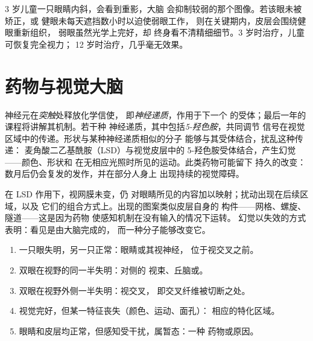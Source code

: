 \begin{example}[为何斜视必须及早治疗]\label{ex:g11:vision-and-brain:amblyopia}
3 岁儿童一只眼睛内斜，会看到重影，大脑
会抑制较弱的那个图像。若该眼未被矫正，或
健眼未每天遮挡数小时以迫使弱眼工作，
则在关键期内，皮层会围绕健眼重新组织，
弱眼虽然光学上完好，却
终身看不清精细细节。3 岁时治疗，儿童可恢复完全视力；
12 岁时治疗，几乎毫无效果。
\end{example}

\section{药物与视觉大脑}

\begin{proposition}\label{prop:g11:vision-and-brain:drugs}
神经元在\emph{突触}处释放化学信使，
即\emph{神经递质}，作用于下一个
的受体；最后一年的课程将讲解其机制。若干种
神经递质，其中包括\emph{5-羟色胺}，共同调节
信号在视觉区域中的传递。形状与某种神经递质相似的分子
能够与其受体结合，扰乱这种传递：
麦角酸二乙基酰胺（LSD）与视觉皮层中的
5-羟色胺受体结合，产生幻觉——颜色、形状和
在无相应光照时所见的运动。此类药物可能留下
持久的改变：数月后仍会复发的发作，并在部分人身上
出现持续的视觉障碍。
\end{proposition}
\admitted

\begin{example}[幻觉说明了什么]\label{ex:g11:vision-and-brain:hallucination}
在 LSD 作用下，视网膜未变，仍
对眼睛所见的内容加以映射；扰动出现在后续区域，以及
它们的组合方式上。出现的图案类似皮层自身的
构件——网格、螺旋、隧道——这是因为药物
使感知机制在没有输入的情况下运转。
幻觉以失效的方式表明：看见是由大脑完成的，
而一种分子能够改变它。
\end{example}

\begin{method}[定位视觉缺陷]\label{met:g11:vision-and-brain:locate}
\begin{enumerate}
  \item 一只眼失明，另一只正常：眼睛或其视神经，
        位于视交叉之前。
  \item 双眼在视野的同一半失明：对侧的
        视束、丘脑或。
  \item 双眼在视野外侧一半失明：视交叉，
        即交叉纤维被切断之处。
  \item 视觉完好，但某一特征丧失（颜色、运动、面孔）：
        相应的特化区域。
  \item 眼睛和皮层均正常，但感知受干扰，属暂态：一种
        药物或原因。
\end{enumerate}
\end{method}

